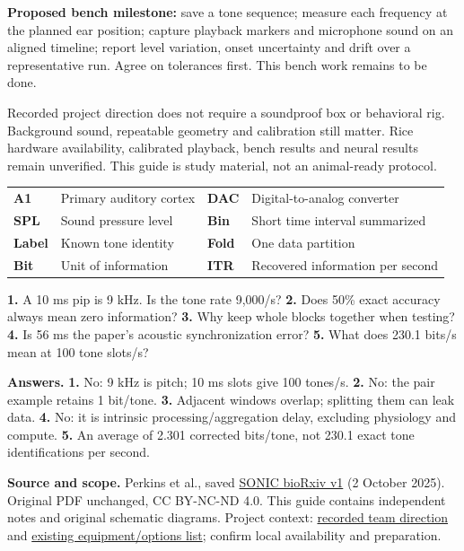 \documentclass[11pt,letterpaper]{article}
\newcommand{\topic}[1]{\vspace{5pt}{\large\bfseries\color{ink}#1}\par\vspace{1pt}}
\newcommand{\takeaway}[1]{\par\vspace{3pt}\begingroup\setlength{\fboxsep}{8pt}
 \colorbox{pale}{\parbox{\dimexpr\linewidth-16pt\relax}{#1}}\endgroup\par\vspace{3pt}}
\newcommand{\smallnote}[1]{{\small\color{muted}#1\par}}
\begin{document}
\takeaway{\textbf{Proposed bench milestone:} save a tone sequence; measure each frequency at the planned ear position; capture playback markers and microphone sound on an aligned timeline; report level variation, onset uncertainty and drift over a representative run. Agree on tolerances first. This bench work remains to be done.}

\smallnote{Recorded project direction does not require a soundproof box or behavioral rig. Background sound, repeatable geometry and calibration still matter. Rice hardware availability, calibrated playback, bench results and neural results remain unverified. This guide is study material, not an animal-ready protocol.}

\topic{Quick glossary}
{\small\begin{tabularx}{\linewidth}{@{}p{1.0in}L p{0.65in}L@{}}
\toprule
\textbf{A1} & Primary auditory cortex & \textbf{DAC} & Digital-to-analog converter\\
\textbf{SPL} & Sound pressure level & \textbf{Bin} & Short time interval summarized\\
\textbf{Label} & Known tone identity & \textbf{Fold} & One data partition\\
\textbf{Bit} & Unit of information & \textbf{ITR} & Recovered information per second\\\bottomrule
\end{tabularx}}

\topic{Cover the answers and check recall}
{\small
\textbf{1.} A 10 ms pip is 9 kHz. Is the tone rate 9,000/s?\quad
\textbf{2.} Does 50\% exact accuracy always mean zero information?\quad
\textbf{3.} Why keep whole blocks together when testing?\quad
\textbf{4.} Is 56 ms the paper's acoustic synchronization error?\quad
\textbf{5.} What does 230.1 bits/s mean at 100 tone slots/s?

\textbf{Answers.} \textbf{1.} No: 9 kHz is pitch; 10 ms slots give 100 tones/s. \textbf{2.} No: the pair example retains 1 bit/tone. \textbf{3.} Adjacent windows overlap; splitting them can leak data. \textbf{4.} No: it is intrinsic processing/aggregation delay, excluding physiology and compute. \textbf{5.} An average of 2.301 corrected bits/tone, not 230.1 exact tone identifications per second.
}

\vfill
{\fontsize{8.5}{10}\selectfont\color{muted}
\textbf{Source and scope.} Perkins et al., saved \href{https://doi.org/10.1101/2025.09.30.679683}{SONIC bioRxiv v1} (2 October 2025). Original PDF unchanged, CC BY-NC-ND 4.0. This guide contains independent notes and original schematic diagrams. Project context: \href{https://github.com/HowardWHSrun/audiotory_benchmark/blob/main/sources/Team_Clarifications_2026-10-07.md}{recorded team direction} and \href{https://github.com/HowardWHSrun/audiotory_benchmark/blob/main/output/pdf/Auditory_Hardware_Options_2026-10-09.pdf}{existing equipment/options list}; confirm local availability and preparation.}
\end{document}
